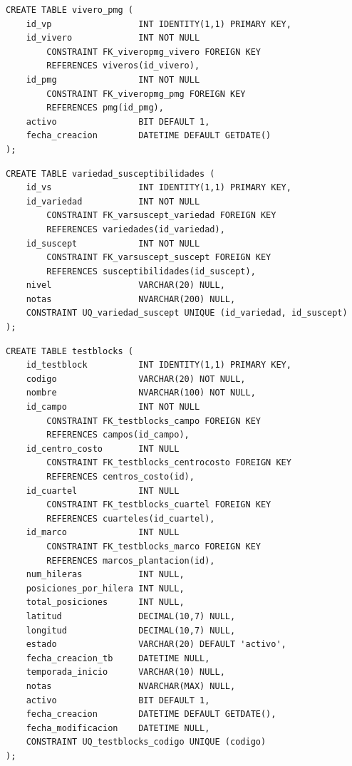 \documentclass[12pt,a4paper,twoside]{report}
\begin{document}
\begin{lstlisting}[style=sqlstyle, caption={vivero\_pmg}]
CREATE TABLE vivero_pmg (
    id_vp                 INT IDENTITY(1,1) PRIMARY KEY,
    id_vivero             INT NOT NULL
        CONSTRAINT FK_viveropmg_vivero FOREIGN KEY
        REFERENCES viveros(id_vivero),
    id_pmg                INT NOT NULL
        CONSTRAINT FK_viveropmg_pmg FOREIGN KEY
        REFERENCES pmg(id_pmg),
    activo                BIT DEFAULT 1,
    fecha_creacion        DATETIME DEFAULT GETDATE()
);
\end{lstlisting}

\begin{lstlisting}[style=sqlstyle, caption={variedad\_susceptibilidades}]
CREATE TABLE variedad_susceptibilidades (
    id_vs                 INT IDENTITY(1,1) PRIMARY KEY,
    id_variedad           INT NOT NULL
        CONSTRAINT FK_varsuscept_variedad FOREIGN KEY
        REFERENCES variedades(id_variedad),
    id_suscept            INT NOT NULL
        CONSTRAINT FK_varsuscept_suscept FOREIGN KEY
        REFERENCES susceptibilidades(id_suscept),
    nivel                 VARCHAR(20) NULL,
    notas                 NVARCHAR(200) NULL,
    CONSTRAINT UQ_variedad_suscept UNIQUE (id_variedad, id_suscept)
);
\end{lstlisting}

\begin{lstlisting}[style=sqlstyle, caption={testblocks}]
CREATE TABLE testblocks (
    id_testblock          INT IDENTITY(1,1) PRIMARY KEY,
    codigo                VARCHAR(20) NOT NULL,
    nombre                NVARCHAR(100) NOT NULL,
    id_campo              INT NOT NULL
        CONSTRAINT FK_testblocks_campo FOREIGN KEY
        REFERENCES campos(id_campo),
    id_centro_costo       INT NULL
        CONSTRAINT FK_testblocks_centrocosto FOREIGN KEY
        REFERENCES centros_costo(id),
    id_cuartel            INT NULL
        CONSTRAINT FK_testblocks_cuartel FOREIGN KEY
        REFERENCES cuarteles(id_cuartel),
    id_marco              INT NULL
        CONSTRAINT FK_testblocks_marco FOREIGN KEY
        REFERENCES marcos_plantacion(id),
    num_hileras           INT NULL,
    posiciones_por_hilera INT NULL,
    total_posiciones      INT NULL,
    latitud               DECIMAL(10,7) NULL,
    longitud              DECIMAL(10,7) NULL,
    estado                VARCHAR(20) DEFAULT 'activo',
    fecha_creacion_tb     DATETIME NULL,
    temporada_inicio      VARCHAR(10) NULL,
    notas                 NVARCHAR(MAX) NULL,
    activo                BIT DEFAULT 1,
    fecha_creacion        DATETIME DEFAULT GETDATE(),
    fecha_modificacion    DATETIME NULL,
    CONSTRAINT UQ_testblocks_codigo UNIQUE (codigo)
);
\end{lstlisting}
\end{document}
